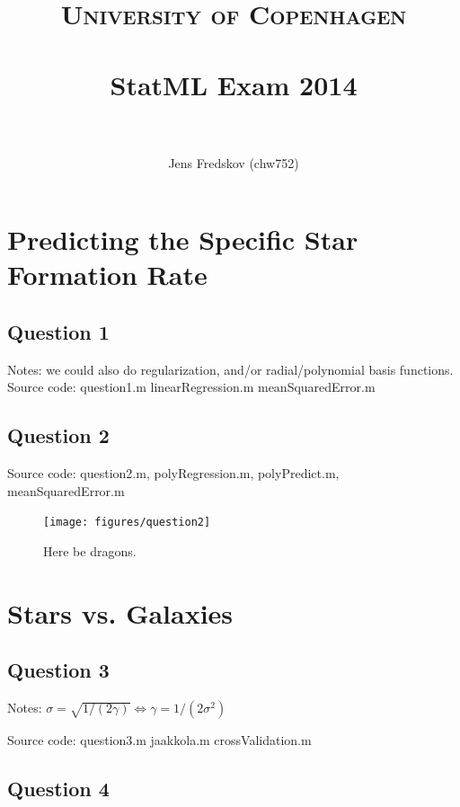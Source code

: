 \documentclass[a4paper, 11pt]{article}
\title{ 
\normalfont\normalsize 
\textsc{University of Copenhagen} \\ [25pt]
\horrule{0.5pt} \\[0.4cm]
\huge StatML\: Exam 2014\\
\horrule{2pt} \\[0.5cm]
}
\author{Jens Fredskov (chw752)}
\begin{document}
\maketitle

\section{Predicting the Specific Star Formation Rate} %
\label{sec:predicting_the_specific_star_formation_rate}

\subsection*{Question 1}
Notes: we could also do regularization, and/or radial/polynomial basis functions.
Source code: question1.m linearRegression.m meanSquaredError.m

\subsection*{Question 2}
Source code: question2.m, polyRegression.m, polyPredict.m, meanSquaredError.m

\begin{figure}[H]
    \centering
    \texttt{[image: figures/question2]}
    \caption{Here be dragons.}\label{fig:question2}
\end{figure}


\section{Stars vs. Galaxies} %
\label{sec:stars_vs_galaxies}

\subsection*{Question 3}

Notes: $\sigma = \sqrt{1 / (2 \gamma)} \Leftrightarrow \gamma = 1 / (2 \sigma^2)$

Source code: question3.m jaakkola.m crossValidation.m

\subsection*{Question 4}
\end{document}
